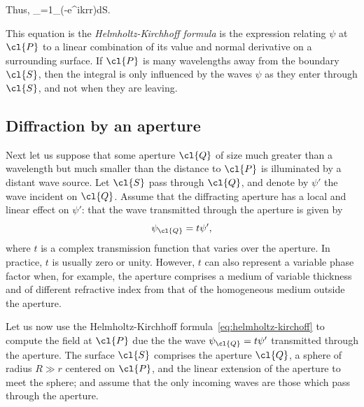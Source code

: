 Thus,
\be
\psi_={1\pi}\int_\left(\psi{}-{e^{ikr}\over r}\nabla\psi\right)\cdot d{\bm S}.
\label{eq:helmholtz-kirchoff}
\ee

This equation is the {\it Helmholtz-Kirchhoff formula} is the expression relating $\psi$ at 
$\cl{P}$ to a linear combination of its value and normal derivative on a surrounding surface.
If $\cl{P}$ is many wavelengths away from the boundary $\cl{S}$, then the integral is only 
influenced by the waves $\psi$ as they enter through $\cl{S}$, and not when they are
leaving.

\subsection{Diffraction by an aperture}

Next let us suppose that some aperture $\cl{Q}$ of size much greater than a wavelength but
much smaller than the distance to $\cl{P}$ is illuminated by a distant wave source. Let 
$\cl{S}$ pass through $\cl{Q}$, and denote by $\psi'$ the wave incident on $\cl{Q}$. Assume
that the diffracting aperture has a local and linear effect on $\psi'$: that the wave 
transmitted through the aperture is given by 
\[
\psi_\cl{Q}=t\psi',
\]
where $t$ is a complex transmission function that varies over the aperture. In practice, $t$
is usually zero or unity. However, $t$ can also represent a variable phase factor when, for
example, the aperture comprises a medium of variable thickness and of different refractive
index from that of the homogeneous medium outside the aperture.

Let us now use the Helmholtz-Kirchhoff formula~\ref{eq:helmholtz-kirchoff} to compute the field
at $\cl{P}$ due the the wave $\psi_\cl{Q}=t\psi'$ transmitted through the aperture. The
surface $\cl{S}$ comprises the aperture $\cl{Q}$, a sphere of radius $R\gg r$ centered on 
$\cl{P}$, and the linear extension of the aperture to meet the sphere; and assume that the only
incoming waves are those which pass through the aperture. 

